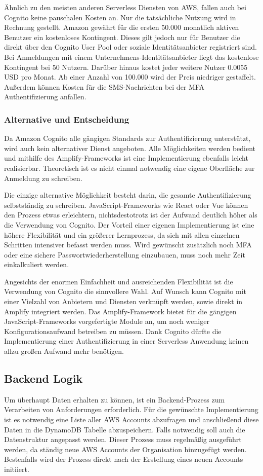 {Ähnlich zu den meisten anderen Serverless Diensten von AWS, fallen auch bei Cognito keine pauschalen Kosten an.
Nur die tatsächliche Nutzung wird in Rechnung gestellt.
Amazon gewährt für die ersten 50.000 monatlich aktiven Benutzer ein kostenloses Kontingent.
Dieses gilt jedoch nur für Benutzer die direkt über den Cognito User Pool oder soziale Identitätsanbieter registriert sind.
Bei Anmeldungen mit einem Unternehmens-Identitätsanbieter liegt das kostenlose Kontingent bei 50 Nutzern.
Darüber hinaus kostet jeder weitere Nutzer 0.0055 USD pro Monat.
Ab einer Anzahl von 100.000 wird der Preis niedriger gestaffelt.
Außerdem können Kosten für die SMS-Nachrichten bei der MFA Authentifizierung anfallen.  \cite[]{CognitoPreise}


\subsubsection{Alternative und Entscheidung}
\label{CognitoEntscheidung}
Da Amazon Cognito alle gängigen Standards zur Authentifizierung unterstützt, wird auch kein alternativer Dienst angeboten.
Alle Möglichkeiten werden bedient und mithilfe des Amplify-Frameworks ist eine Implementierung ebenfalls leicht realisierbar.
Theoretisch ist es nicht einmal notwendig eine eigene Oberfläche zur Anmeldung zu schreiben.

Die einzige alternative Möglichkeit besteht darin, die gesamte Authentifizierung selbstständig zu schreiben.
JavaScript-Frameworks wie React oder Vue können den Prozess etwas erleichtern, nichtsdestotrotz ist der Aufwand deutlich höher als die Verwendung von Cognito.
Der Vorteil einer eigenen Implementierung ist eine höhere Flexibilität und ein größerer Lernprozess, da sich mit allen einzelnen Schritten intensiver befasst werden muss.
Wird gewünscht zusätzlich noch MFA oder eine sichere Passwortwiederherstellung einzubauen, muss noch mehr Zeit einkalkuliert werden.

Angesichts der enormen Einfachheit und ausreichenden Flexibilität ist die Verwendung von Cognito die sinnvollere Wahl.
Auf Wunsch kann Cognito mit einer Vielzahl von Anbietern und Diensten verknüpft werden, sowie direkt in Amplify integriert werden.
Das Amplify-Framework bietet für die gängigen JavaScript-Frameworks vorgefertigte Module an, um noch weniger Konfigurationsaufwand betreiben zu müssen.
Dank Cognito dürfte die Implementierung einer Authentifizierung in einer Serverless Anwendung keinen allzu großen Aufwand mehr benötigen.


\subsection{Backend Logik}
Um überhaupt Daten erhalten zu können, ist ein Backend-Prozess zum Verarbeiten von Anforderungen erforderlich.
Für die gewünschte Implementierung ist es notwendig eine Liste aller AWS Accounts abzufragen und anschließend diese Daten in die DynamoDB Tabelle abzuspeichern.
Falls notwendig soll auch die Datenstruktur angepasst werden.
Dieser Prozess muss regelmäßig ausgeführt werden, da ständig neue AWS Accounts der Organisation hinzugefügt werden.
Bestenfalls wird der Prozess direkt nach der Erstellung eines neuen Accounts initiiert.

}
